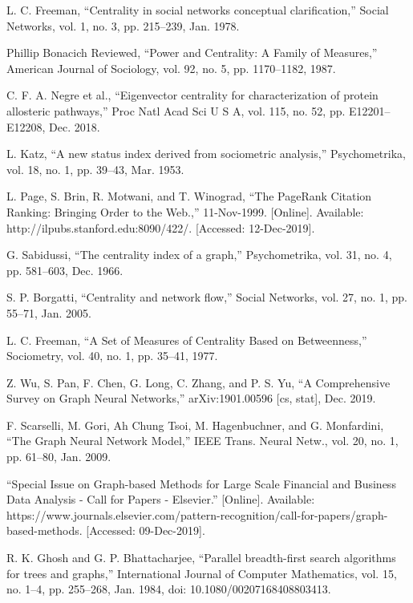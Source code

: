 \documentclass[journal,twoside,web]{ieeecolor}
\begin{document}
\begin{thebibliography}{9}
    L. C. Freeman, “Centrality in social networks conceptual clarification,” Social Networks, vol. 1, no. 3, pp. 215–239, Jan. 1978.
    
    Phillip Bonacich Reviewed, “Power and Centrality: A Family of Measures,” American Journal of Sociology, vol. 92, no. 5, pp. 1170–1182, 1987.
    
    C. F. A. Negre et al., “Eigenvector centrality for characterization of protein allosteric pathways,” Proc Natl Acad Sci U S A, vol. 115, no. 52, pp. E12201–E12208, Dec. 2018.
    
    L. Katz, “A new status index derived from sociometric analysis,” Psychometrika, vol. 18, no. 1, pp. 39–43, Mar. 1953.
    
    L. Page, S. Brin, R. Motwani, and T. Winograd, “The PageRank Citation Ranking: Bringing Order to the Web.,” 11-Nov-1999. [Online]. Available: http://ilpubs.stanford.edu:8090/422/. [Accessed: 12-Dec-2019].
    
    G. Sabidussi, “The centrality index of a graph,” Psychometrika, vol. 31, no. 4, pp. 581–603, Dec. 1966.
    
    S. P. Borgatti, “Centrality and network flow,” Social Networks, vol. 27, no. 1, pp. 55–71, Jan. 2005.
    
    L. C. Freeman, “A Set of Measures of Centrality Based on Betweenness,” Sociometry, vol. 40, no. 1, pp. 35–41, 1977.
    
    Z. Wu, S. Pan, F. Chen, G. Long, C. Zhang, and P. S. Yu, “A Comprehensive Survey on Graph Neural Networks,” arXiv:1901.00596 [cs, stat], Dec. 2019.
    
    F. Scarselli, M. Gori, Ah Chung Tsoi, M. Hagenbuchner, and G. Monfardini, “The Graph Neural Network Model,” IEEE Trans. Neural Netw., vol. 20, no. 1, pp. 61–80, Jan. 2009.
    
    “Special Issue on Graph-based Methods for Large Scale Financial and Business Data Analysis - Call for Papers - Elsevier.” [Online]. Available: https://www.journals.elsevier.com/pattern-recognition/call-for-papers/graph-based-methods. [Accessed: 09-Dec-2019].
    
     R. K. Ghosh and G. P. Bhattacharjee, “Parallel breadth-first search algorithms for trees and graphs,” International Journal of Computer Mathematics, vol. 15, no. 1–4, pp. 255–268, Jan. 1984, doi: 10.1080/00207168408803413.


\end{thebibliography}
\end{document}
